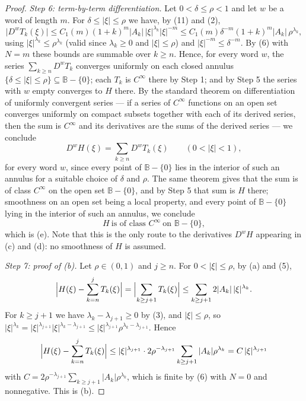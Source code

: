 \begin{proof}
\emph{Step 6: term-by-term differentiation.}  Let $0<\delta\le\rho<1$ and let
$w$ be a word of length $m$.  For $\delta\le|\xi|\le\rho$ we have, by (11) and
(2),
\[
  \bigl|D^{w}T_k(\xi)\bigr|
  \le C_1(m)(1+k)^{m}|A_k|\,|\xi|^{\lambda_k}|\xi|^{-m}
  \le C_1(m)\delta^{-m}(1+k)^{m}|A_k|\,\rho^{\lambda_k},
\]
using $|\xi|^{\lambda_k}\le\rho^{\lambda_k}$ (valid since $\lambda_k\ge0$ and
$|\xi|\le\rho$) and $|\xi|^{-m}\le\delta^{-m}$.  By (6) with $N=m$ these bounds
are summable over $k\ge n$.  Hence, for every word $w$, the series
$\sum_{k\ge n}D^{w}T_k$ converges uniformly on each closed annulus
$\{\delta\le|\xi|\le\rho\}\subseteq\mathbb{B}-\{0\}$; each $T_k$ is $C^\infty$
there by Step 1; and by Step 5 the series with $w$ empty converges to $H$
there.  By the standard theorem on differentiation of uniformly convergent
series --- if a series of $C^\infty$ functions on an open set converges
uniformly on compact subsets together with each of its derived series, then the
sum is $C^\infty$ and its derivatives are the sums of the derived series --- we
conclude
\begin{equation}\tag{13}
  D^{w}H(\xi)=\sum_{k\ge n}D^{w}T_k(\xi)\qquad(0<|\xi|<1),
\end{equation}
for every word $w$, since every point of $\mathbb{B}-\{0\}$ lies in the
interior of such an annulus for a suitable choice of $\delta$ and $\rho$.  The
same theorem gives that the sum is of class $C^\infty$ on the open set
$\mathbb{B}-\{0\}$, and by Step 5 that sum is $H$ there; smoothness on an open
set being a local property, and every point of $\mathbb{B}-\{0\}$ lying in the
interior of such an annulus, we conclude
\begin{equation}\tag{13$'$}
  H\ \text{is of class }C^\infty\ \text{on }\mathbb{B}-\{0\},
\end{equation}
which is (e).  Note that this is the only route to the derivatives $D^{w}H$
appearing in (c) and (d): no smoothness of $H$ is assumed.

\emph{Step 7: proof of (b).}  Let $\rho\in(0,1)$ and $j\ge n$.  For
$0<|\xi|\le\rho$, by (a) and (5),
\[
  \Bigl|H(\xi)-\sum_{k=n}^{j}T_k(\xi)\Bigr|
  =\Bigl|\sum_{k\ge j+1}T_k(\xi)\Bigr|
  \le\sum_{k\ge j+1}2|A_k|\,|\xi|^{\lambda_k}.
\]
For $k\ge j+1$ we have $\lambda_k-\lambda_{j+1}\ge0$ by (3), and $|\xi|\le\rho$,
so $|\xi|^{\lambda_k}=|\xi|^{\lambda_{j+1}}|\xi|^{\lambda_k-\lambda_{j+1}}
\le|\xi|^{\lambda_{j+1}}\rho^{\lambda_k-\lambda_{j+1}}$.  Hence
\[
  \Bigl|H(\xi)-\sum_{k=n}^{j}T_k(\xi)\Bigr|
  \le|\xi|^{\lambda_{j+1}}\cdot2\rho^{-\lambda_{j+1}}
    \sum_{k\ge j+1}|A_k|\rho^{\lambda_k}
  =C\,|\xi|^{\lambda_{j+1}}
\]
with $C=2\rho^{-\lambda_{j+1}}\sum_{k\ge j+1}|A_k|\rho^{\lambda_k}$, which is
finite by (6) with $N=0$ and nonnegative.  This is (b).


\end{proof}
